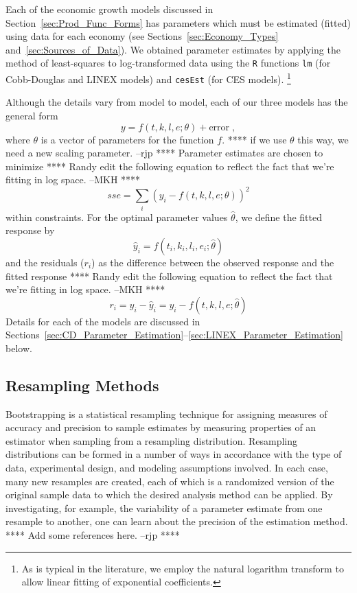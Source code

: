\documentclass[preprint,authoryear,12pt]{elsarticle}\usepackage[]{graphicx}\usepackage[]{color}
\begin{document}
Each of the economic growth models discussed in 
Section~\ref{sec:Prod_Func_Forms} has parameters which must be estimated (fitted)
using data for each economy (see Sections~\ref{sec:Economy_Types} and~\ref{sec:Sources_of_Data}).
We obtained parameter estimates by applying the method of least-squares to 
log-transformed data using the \texttt{R} \citep{R} functions
\texttt{lm} (for Cobb-Douglas and LINEX models) 
and \texttt{cesEst} \citep{Henningsen:2011td} (for CES models).%
  \footnote{
  As is typical in the literature, we employ the natural logarithm transform
  to allow linear fitting of exponential coefficients.
  }

Although the details vary from model to model, each of our three models has the general form
%
\begin{equation}
  y = f(t,k,l,e; \theta) + \mathrm{error} \;,
\end{equation}
%
where $\theta$ is a vector of parameters for the function $f$.
**** if we use $\theta$ this way, we need a new scaling parameter. --rjp ****
Parameter estimates are chosen to minimize
**** Randy edit the following equation to reflect the fact that we're fitting in log space. --MKH ****
%
\begin{equation} \label{eq:sse}
  sse = \sum_{i} (y_i - f(t,k,l,e; \theta) )^2
\end{equation}
%
within constraints.
For the optimal parameter values $\hat \theta$, we define the 
fitted response by
%
\begin{equation}
  \hat y_i = f(t_i, k_i, l_i, e_i; \hat \theta)
\end{equation}
%
and the residuals ($r_i$)
as the difference between the observed response and the fitted response
**** Randy edit the following equation to reflect the fact that we're fitting in log space. --MKH ****
%
\begin{equation} \label{eq:residual}
  r_i 
  = y_i - \hat y_i
  = y_i - f(t,k,l,e; \hat\theta)
\end{equation}
%
Details for each of the models are discussed in 
Sections~\ref{sec:CD_Parameter_Estimation}--\ref{sec:LINEX_Parameter_Estimation} below.


\subsection{Resampling Methods}
\label{sec:Resampling}

Bootstrapping is a statistical resampling technique for assigning
measures of accuracy and precision to sample estimates by measuring
properties of an estimator when sampling from a resampling
distribution.  
Resampling distributions can be formed in a number of 
ways in accordance with the type of data, experimental design,
and modeling assumptions involved.  
In each case, many new resamples 
are created, each of which is a randomized version of the original sample data to 
which the desired analysis method can be applied.  
By investigating, for example,
the variability of a parameter estimate from one resample to another,
one can learn about the precision of the estimation method.
**** Add some references here. --rjp ****
\end{document}
